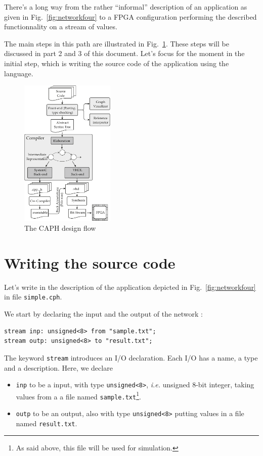 There's a long way from the rather ``informal'' description of an application as given in 
Fig.~\ref{fig:networkfour} to a FPGA configuration performing the described functionnality on a
stream of values.

The main steps in this path are illustrated in Fig.~\ref{fig:toolset}. These steps will be discussed
in part 2 and 3 of this document. Let's focus for the moment in the initial step, which is 
writing the source code of the application using the \caph language.

\begin{figure}[h]
  \centering
  \includegraphics[width=0.4\textwidth]{figs/toolset}
  \caption{The CAPH design flow}
  \label{fig:toolset}
\end{figure}

\section{Writing the source code}
\label{sec:writing-source-code}

Let's write in \caph the description of the application depicted
in Fig.~\ref{fig:networkfour} in file \texttt{simple.cph}.

\medskip
We start by declaring the input and the output of the network :

\begin{lstlisting}[style=CaphStyle]
stream inp: unsigned<8> from "sample.txt";
stream outp: unsigned<8> to "result.txt";
\end{lstlisting}

The keyword \texttt{stream} introduces an I/O declaration. Each I/O has a name, a type and a
description. Here, we declare
\begin{itemize}
\item \texttt{inp} to be a input, with type \verb|unsigned<8>|, \emph{i.e.}
unsigned 8-bit integer, taking  values from a a file named \texttt{sample.txt}\footnote{As said
  above, this file will be used for simulation.}. 
\item \texttt{outp} to be an output, also with type \verb|unsigned<8>| putting values in a file
  named \texttt{result.txt}.
\end{itemize}

